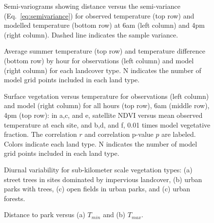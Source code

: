 \begin{figure}[h]
\centering
\caption{Semi-variograms showing distance versus the semi-variance (Eq.~\ref{eq:semivariance}) for observed temperature (top row) and modelled temperature (bottom row) at 6am (left column) and 4pm (right column). Dashed line indicates the sample variance. 
}\label{fig:semiv_obs}
\end{figure}

\begin{figure}[h]
\centering
\caption{Average summer temperature (top row) and temperature difference (bottom row) by hour for observations (left column) and model (right column) for each landcover type. N indicates the number of model grid points included in each land type. }
\label{fig:diurnal}
\end{figure}


\begin{figure}[h]
\centering
\caption{Surface vegetation versus temperature for observations (left column) and model (right column) for all hours (top row), 6am (middle row), 4pm (top row): in a,c, and e, satellite NDVI versus mean observed temperature at each site, and b,d, and f, 0.01 times model vegetative fraction. The correlation $r$ and correlation p-value $p$ are labeled. Colors indicate each land type. N indicates the number of model grid points included in each land type.}
\label{fig:veg}
\end{figure}

\begin{figure}
\centering
\caption{Diurnal variability for sub-kilometer scale vegetation types: (a) street trees in sites dominated by impervious landcover, (b) urban parks with trees, (c) open fields in urban parks, and (c) urban forests. }
\label{fig:diurnal_urbanforests_etc}
\end{figure}

\begin{figure}
\centering
\caption{Distance to park versus (a) $T_{min}$ and (b) $T_{max}$.}
\label{fig:distance to park}
\end{figure}


